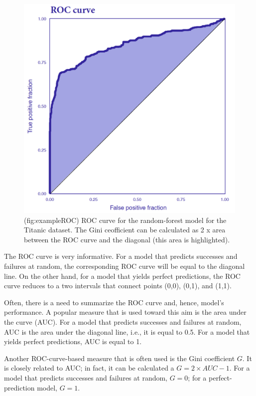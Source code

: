 \documentclass[12pt,]{krantz}
\begin{document}
\begin{figure}

{\centering \includegraphics[width=0.8\linewidth]{figure/ROCcurve} 

}

\caption{(fig:exampleROC) ROC curve for the random-forest model for the Titanic dataset. The Gini ceofficient can be calculated as 2 x area between the ROC curve and the diagonal (this area is highlighted).}\label{fig:exampleROC}
\end{figure}

The ROC curve is very informative. For a model that predicts successes and failures at random, the corresponding ROC curve will be equal to the diagonal line. On the other hand, for a model that yields perfect predictions, the ROC curve reduces to a two intervals that connect points (0,0), (0,1), and (1,1).

Often, there is a need to summarize the ROC curve and, hence, model's performance. A popular measure that is used toward this aim is the area under the curve (AUC). For a model that predicts successes and failures at random, AUC is the area under the diagonal line, i.e., it is equal to 0.5. For a model that yields perfect predictions, AUC is equal to 1.

Another ROC-curve-based measure that is often used is the Gini coefficient \(G\). It is closely related to AUC; in fact, it can be calculated a \(G = 2 \times AUC - 1\). For a model that predicts successes and failures at random, \(G=0\); for a perfect-prediction model, \(G = 1\).
\end{document}
